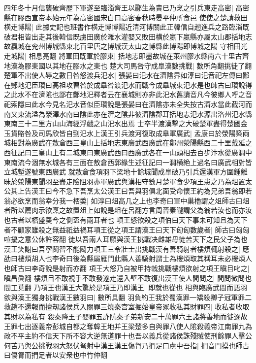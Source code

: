 四年冬十月信襲破齊歷下軍遂至臨淄齊王以酈生為賣已乃烹之引兵東走高密|{
	高密縣在膠西宣帝本始元年為高密國宋白曰高密春秋時晏平仲所食邑}
使使之楚請救田横走博陽|{
	此據史記也班書作横走博博陽近清河博關此正韓信自趙進兵之路臨淄既破君相皆出走其後韓信既虜田廣於濰水灌嬰又敗田横於嬴下嬴縣亦屬太山郡括地志故嬴城在兖州博城縣東北百里唐之博城漢太山之博縣此博陽即博城之陽}
守相田光走城陽|{
	相息亮翻}
將軍田既軍於膠東|{
	括地志即墨故城在萊州膠水縣南六十里古齊地漢為膠東國以其地在膠水之東也}
楚大司馬咎守成臯漢數挑戰|{
	數所角翻挑徒了翻}
楚軍不出使人辱之數日咎怒渡兵汜水|{
	張晏曰汜水在濟隂界如淳曰汜音祀左傳曰鄙在鄭地汜臣瓚曰高祖攻曹咎於成臯咎渡汜水而戰今成臯城東汜水是也師古曰瓚說得之此水不在濟隂也鄙在鄭地汜釋者云在襄城則亦非此汜水舊讀音凡今彼鄉人呼之音祀索隱曰此水今見名汜水音似臣瓚說是張晏曰在濟隂亦未全失按古濟水當此截河而南又東流溢為滎澤水南曰隂此亦在濟之隂非彼濟隂郡耳括地志汜水源出洛州汜水縣東南三十二里方山山海經浮戲之山汜水出焉}
士卒半渡漢擊之大破楚軍盡得楚國金玉貨賂咎及司馬欣皆自剄汜水上漢王引兵渡河復取成臯軍廣武|{
	孟康曰於滎陽築兩城相對為廣武在敖倉西三皇山上括地志東廣武西廣武在鄭州滎陽縣西二十里戴延之西征記曰三皇山上有二城東曰東廣武西曰西廣武各在一山頭相去百步汴水從廣澗中東南流今涸無水城各有三面在敖倉西郭緣生述征記曰一澗横絶上過名曰廣武相對皆立城塹遂號東西廣武}
就敖倉食項羽下梁地十餘城聞成臯破乃引兵還漢軍方圍鍾離昧於滎陽東聞羽至盡走險阻羽亦軍廣武與漢相守數月楚軍食少項王患之乃為俎置太公其上告漢王曰今不急下吾烹太公漢王曰吾與羽俱北面受命懷王約為兄弟吾翁即若翁必欲烹而翁幸分我一桮羮|{
	如淳曰俎高几之上也李奇曰軍中巢櫓謂之俎師古曰俎者所以薦肉示欲烹之故置俎上如說是俎在呂翻方言周晉秦隴謂父為翁若汝也而亦汝也古者以桮盛羮今之側盃有兩耳者也}
項王怒欲殺之項伯曰天下事未可知且為天下者不顧家雖殺之無益祇益禍耳項王從之項王謂漢王曰天下匈匈數歲者|{
	師古曰匈匈喧擾之意公休許容翻}
徒以吾兩人耳願與漢王挑戰决雌雄毋徒苦天下之民父子為也漢王笑謝曰吾寧鬬智不能鬬力項王三令壯士出挑戰漢有善騎射者樓煩輒射殺之|{
	應劭曰樓煩胡人也李奇曰後為縣屬雁門此縣人善騎射謂士為樓煩取其稱耳未必樓煩人也師古曰李奇說是射而亦翻}
項王大怒乃自被甲持戟挑戰樓煩欲射之項王瞋目叱之|{
	瞋昌眞翻}
樓煩目不敢視手不敢發遂走還入壁不敢復出漢王使人間問之|{
	間問微問也間工莧翻}
乃項王也漢王大驚於是項王乃即漢王|{
	即就也從也}
相與臨廣武間而語羽欲與漢王獨身挑戰漢王數羽曰|{
	數所具翻}
羽負約王我於蜀漢罪一矯殺卿子冠軍罪二救趙不還報而擅刼諸侯兵入關罪三燒秦宫室掘始皇帝冢收私其財罪四|{
	收私者收取其財以為私有}
殺秦降王子嬰罪五詐阬秦子弟新安二十萬罪六王諸將善地而徙逐故王罪七出逐義帝彭城自都之奪韓王地并王梁楚多自與罪八使人隂殺義帝江南罪九為政不平主約不信天下所不容大逆無道罪十也吾以義兵從諸侯誅殘賊使刑餘罪人擊公何苦乃與公挑戰羽大怒伏弩射中漢王漢王傷胷乃捫足曰虜中吾指|{
	捫音門摸也師古曰傷胷而捫足者以安衆也中竹仲翻}
